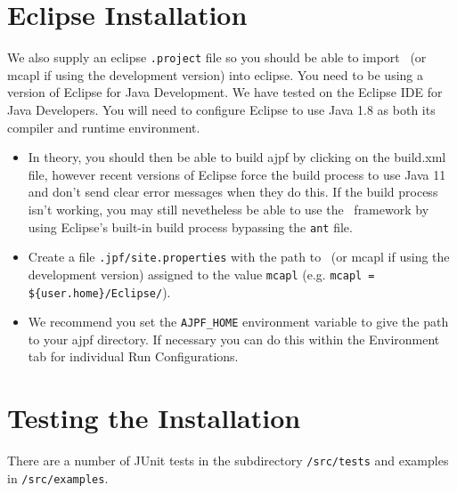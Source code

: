 \section{Eclipse Installation}

We also supply an eclipse \texttt{.project} file so you should be able to import \ajpfversion\ (or mcapl if using the development version)  into eclipse.  You need to be using a version of Eclipse for Java Development.  We have tested on the Eclipse IDE for Java Developers.  You will need to configure Eclipse to use Java 1.8 as both its compiler and runtime environment.
\begin{itemize}
\item In theory, you should then be able to build ajpf by clicking on the build.xml file, however recent versions of Eclipse force the build process to use Java 11 and don't send clear error messages when they do this.  If the build process isn't working, you may still nevetheless be able to use the \mcapl\ framework by using Eclipse's built-in build process bypassing the \texttt{ant} file.
\item Create a file \texttt{.jpf/site.properties} with the path to \ajpfversion\ (or mcapl if using the development version)  assigned to the value \texttt{mcapl} (e.g. \texttt{mcapl = \$\{user.home\}/Eclipse/\ajpfversion}).
\item We recommend you set the \texttt{AJPF\_HOME} environment variable to give the path to your ajpf directory.  If necessary you can do this within the Environment tab for individual Run Configurations.
\end{itemize}

\section{Testing the Installation}

There are a number of JUnit tests in the subdirectory \texttt{/src/tests} and examples in \texttt{/src/examples}.

